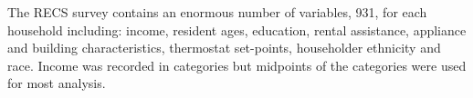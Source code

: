 \documentclass{article}
\begin{document}
The RECS survey contains an enormous number of variables, 931, for each household including: income, resident ages, education, rental assistance, appliance and building characteristics, thermostat set-points, householder ethnicity and race.  Income was recorded in categories but midpoints of the categories were used for most analysis. 
% 
% 



  
\end{document}
